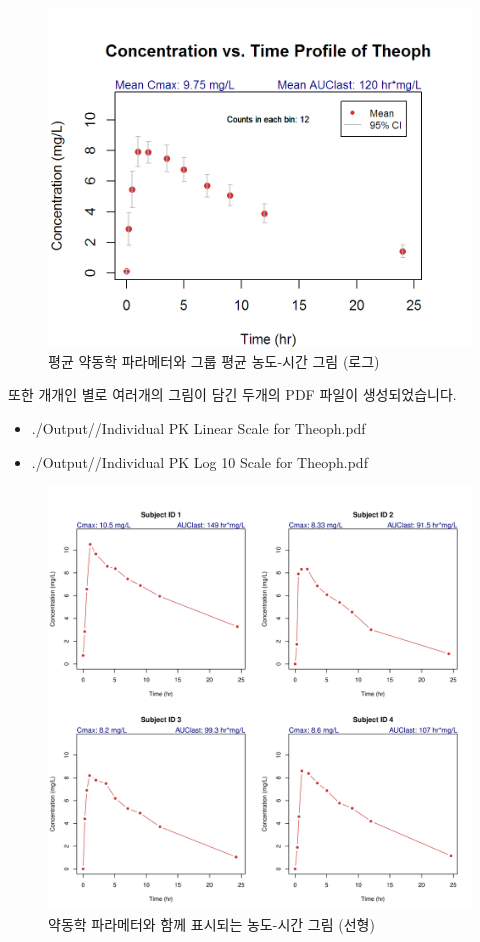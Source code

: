 \documentclass[12pt,]{krantz}
\providecommand{\tightlist}{%
  \setlength{\itemsep}{0pt}\setlength{\parskip}{0pt}}
\theoremstyle{definition}
\theoremstyle{definition}
\theoremstyle{definition}
\theoremstyle{remark}
\begin{document}
\begin{figure}
\centering
\includegraphics{Output/PK_Profile_with_CI_for_Theoph.png}
\caption{\label{fig:unnamed-chunk-21}평균 약동학 파라메터와 그룹 평균
농도-시간 그림 (로그)}
\end{figure}

또한 개개인 별로 여러개의 그림이 담긴 두개의 PDF 파일이 생성되었습니다.

\begin{itemize}
\tightlist
\item
  ./Output//Individual PK Linear Scale for Theoph.pdf
\item
  ./Output//Individual PK Log 10 Scale for Theoph.pdf
\end{itemize}

\begin{figure}
\centering
\includegraphics{Output/Individual_PK_Linear_Scale_for_Theoph00.png}
\caption{\label{fig:unnamed-chunk-22}약동학 파라메터와 함께 표시되는
농도-시간 그림 (선형)}
\end{figure}
\end{document}
